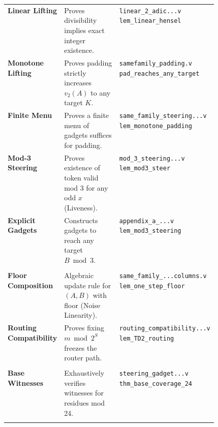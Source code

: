 \documentclass[11pt,letterpaper]{amsart}
\theoremstyle{definition}
\theoremstyle{plain}
\theoremstyle{plain}
\theoremstyle{remark}
\begin{document}
\begin{xltabular}{\linewidth}{@{}>{\raggedright\arraybackslash}p{0.20\linewidth} X >{\raggedright\arraybackslash}p{0.28\linewidth}@{}}
\textbf{Linear Lifting} &
  Proves divisibility implies exact integer existence. &
  \texttt{linear\_2\_adic...v} \newline
  \texttt{lem\_linear\_hensel} \\
\addlinespace[4pt]

\textbf{Monotone Lifting} &
  Proves padding strictly increases $v_2(A)$ to any target $K$. &
  \texttt{samefamily\_padding.v} \newline
  \texttt{pad\_reaches\_any\_target} \\
\addlinespace[4pt]

\textbf{Finite Menu} &
  Proves a finite menu of gadgets suffices for padding. &
  \texttt{same\_family\_steering...v} \newline
  \texttt{lem\_monotone\_padding} \\
\addlinespace[4pt]

\textbf{Mod-3 Steering} &
  Proves existence of token valid mod 3 for any odd $x$ (Liveness). &
  \texttt{mod\_3\_steering...v} \newline
  \texttt{lem\_mod3\_steer} \\
\addlinespace[4pt]

\textbf{Explicit Gadgets} &
  Constructs gadgets to reach any target $B \bmod 3$. &
  \texttt{appendix\_a\_...v} \newline
  \texttt{lem\_mod3\_steering} \\

\midrule
{} \\
\midrule
\textbf{Floor Composition} &
  Algebraic update rule for $(A,B)$ with floor (Noise Linearity). &
  \texttt{same\_family\_...columns.v} \newline
  \texttt{lem\_one\_step\_floor} \\
\addlinespace[4pt]

\textbf{Routing Compatibility} &
  Proves fixing $m \bmod 2^S$ freezes the router path. &
  \texttt{routing\_compatibility...v} \newline
  \texttt{lem\_TD2\_routing} \\

\midrule
{} \\
\midrule
\textbf{Base Witnesses} &
  Exhaustively verifies witnesses for residues mod 24. &
  \texttt{steering\_gadget...v} \newline
  \texttt{thm\_base\_coverage\_24} \\
\addlinespace[4pt]


\end{xltabular}
\end{document}
